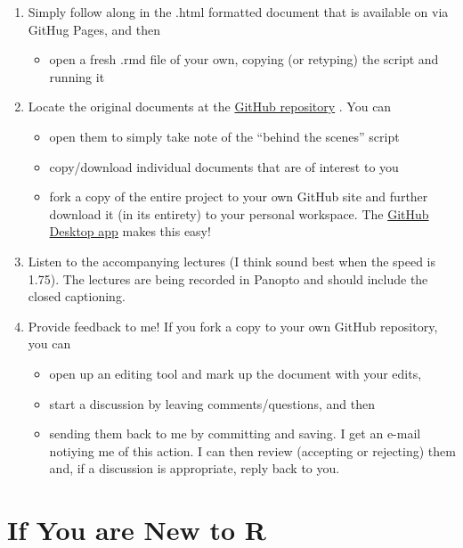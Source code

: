 \documentclass[
  english,
]{book}
\providecommand{\tightlist}{%
  \setlength{\itemsep}{0pt}\setlength{\parskip}{0pt}}
\begin{document}
\begin{enumerate}
\def\labelenumi{\arabic{enumi}.}
\tightlist
\item
  Simply follow along in the .html formatted document that is available on via GitHug Pages, and then

  \begin{itemize}
  \tightlist
  \item
    open a fresh .rmd file of your own, copying (or retyping) the script and running it
  \end{itemize}
\item
  Locate the original documents at the \href{https://github.com/lhbikos/ReCenterPsychStats}{GitHub repository} . You can

  \begin{itemize}
  \tightlist
  \item
    open them to simply take note of the ``behind the scenes'' script
  \item
    copy/download individual documents that are of interest to you
  \item
    fork a copy of the entire project to your own GitHub site and further download it (in its entirety) to your personal workspace. The \href{https://desktop.github.com/}{GitHub Desktop app} makes this easy!
  \end{itemize}
\item
  Listen to the accompanying lectures (I think sound best when the speed is 1.75). The lectures are being recorded in Panopto and should include the closed captioning.
\item
  Provide feedback to me! If you fork a copy to your own GitHub repository, you can

  \begin{itemize}
  \tightlist
  \item
    open up an editing tool and mark up the document with your edits,
  \item
    start a discussion by leaving comments/questions, and then
  \item
    sending them back to me by committing and saving. I get an e-mail notiying me of this action. I can then review (accepting or rejecting) them and, if a discussion is appropriate, reply back to you.
  \end{itemize}
\end{enumerate}

\hypertarget{if-you-are-new-to-r}{%
\section{If You are New to R}\label{if-you-are-new-to-r}}
\end{document}
